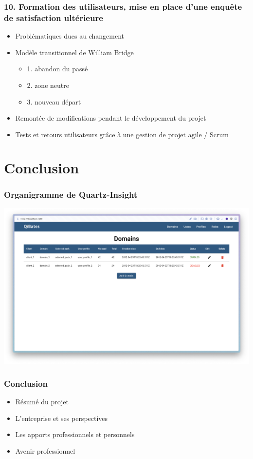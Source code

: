 \documentclass[aspectratio=169]{beamer}
\begin{document}
\begin{frame}
  \frametitle{10. Formation des utilisateurs, mise en place d’une enquête de satisfaction ultérieure}
  \begin{itemize}
    \item Problématiques dues au changement
    \item Modèle transitionnel de William Bridge
      \begin{itemize}
        \item 1. abandon du passé
        \item 2. zone neutre
        \item 3. nouveau départ 
      \end{itemize}
    \item Remontée de modifications pendant le développement du projet
    \item Tests et retours utilisateurs grâce à une gestion de projet agile / Scrum
  \end{itemize}
\end{frame}

\section{Conclusion}

\begin{frame}
    \frametitle{Organigramme de Quartz-Insight}
    \includegraphics[height=0.75\textheight, center]{Imgs/felix.png}
\end{frame}

\begin{frame}
  \frametitle{Conclusion}
  \begin{itemize}
    \item Résumé du projet
    \item L'entreprise et ses perspectives
    \item Les apports professionnels et personnels
    \item Avenir professionnel
  \end{itemize}
\end{frame}
\end{document}
